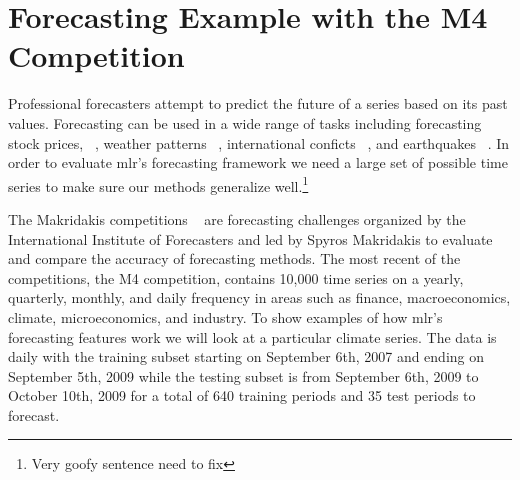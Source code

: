 \documentclass{article}\usepackage[]{graphicx}\usepackage[]{color}
\theoremstyle{definition}
\newcommand{\pkg}[1]{{\fontseries{b}\selectfont #1}}
\begin{document}
\section{Forecasting Example with the M4 Competition}
\label{sec:m4data}

Professional forecasters attempt to predict the future of a series based on its past values. Forecasting can be used in a wide range of tasks including forecasting stock prices, ~\cite{GRANGER19923}, weather patterns ~\cite{MurphymeteoForecast}, international conficts ~\cite{Chadefaux01012014}, and earthquakes ~\cite{earthquakeYegu}. In order to evaluate \pkg{mlr}'s forecasting framework we need a large set of possible time series to make sure our methods generalize well.\footnote{Very goofy sentence need to fix}

The Makridakis competitions ~\cite{Makridakis2000451} are forecasting challenges organized by the International Institute of Forecasters and led by Spyros Makridakis to evaluate and compare the accuracy of forecasting methods. The most recent of the competitions, the M4 competition, contains 10,000 time series on a yearly, quarterly, monthly, and daily frequency in areas such as finance, macroeconomics, climate, microeconomics, and industry. To show examples of how \pkg{mlr}'s forecasting features work we will look at a particular climate series. The data is daily with the training subset starting on September 6th, 2007 and ending on September 5th, 2009 while the testing subset is from September 6th, 2009 to October 10th, 2009 for a total of 640 training periods and 35 test periods to forecast.


\end{document}
